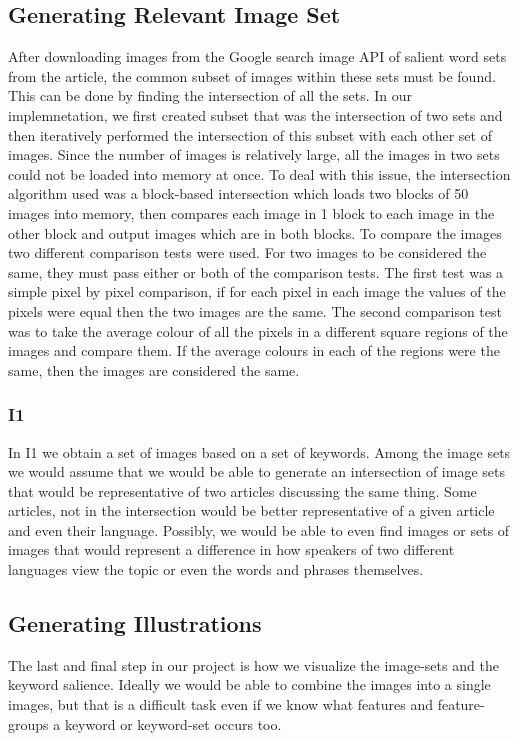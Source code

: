 \documentclass[12pt]{article}
\begin{document}
\subsection{Generating Relevant Image Set}
After downloading images from the Google search image API of salient word sets from the article, the common subset of images within these sets must be found. This can be done by finding the intersection of all the sets. In our implemnetation, we first created subset that was the intersection of two sets and then iteratively performed the intersection of this subset with each other set of images.
Since the number of images is relatively large, all the images in two sets could not be loaded into memory at once. To deal with this issue, the intersection algorithm used was a block-based intersection which loads two blocks of 50 images into memory, then compares each image in 1 block to each image in the other block and output images which are in both blocks.
To compare the images two different comparison tests were used. For two images to be considered the same, they must pass either or both of the comparison tests. The first test was a simple pixel by pixel comparison, if for each pixel in each image the values of the pixels were equal then the two images are the same. The second comparison test was to take the average colour of all the pixels in a different square regions of the images and compare them. If the average colours in each of the regions were the same, then the images are considered the same.

\subsubsection{I1}
In I1 we obtain a set of images based on a set of keywords. Among the image sets we would assume that we would 
be able to generate an intersection of image sets that would be representative of two articles discussing the 
same thing. Some articles, not in the intersection would be better representative of a given article and even their language. 
Possibly, we would be able to even find images or sets of images that would represent a difference in how speakers of two different languages
view the topic or even the words and phrases themselves.

\subsection{Generating Illustrations}
The last and final step in our project is how we visualize the image-sets and the keyword salience. Ideally we would be able to combine the images into a single images, but that is a difficult task even if we know what features and feature-groups a keyword or keyword-set occurs too.
\end{document}
